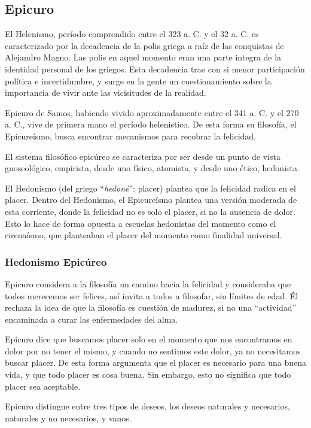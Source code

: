 \documentclass{article}
\begin{document}
\subsection{Epicuro}

El Helenismo, período comprendido entre el 323 a. C. y el 32 a. C. es caracterizado por la decadencia de la polis griega a raíz de las conquistas de Alejandro Magno. Las polis en aquel momento eran una parte integra de la identidad personal de los griegos. Esta decadencia trae con si menor participación política e incertidumbre, y surge en la gente un cuestionamiento sobre la importancia de vivir ante las vicisitudes de la realidad. 

Epicuro de Samos, habiendo vivido aproximadamente entre el 341 a. C. y el 270 a. C., vive de primera mano el período helenistico. De esta forma su filosofía, el Epicureísmo, busca encontrar mecanismos para recobrar la felicidad.

El sistema filosófico epicúreo se caracteriza por ser desde un punto de vista gnoseológico, empirista, desde uno físico, atomista, y desde uno ético, hedonista.

El Hedonismo (del griego ``\textit{hedoné}'': placer) plantea que la felicidad radica en el placer. Dentro del Hedonismo, el Epicureísmo plantea una versión moderada de esta corriente, donde la felicidad no es solo el placer, si no la ausencia de dolor. Esto lo hace de forma opuesta a escuelas hedonistas del momento como el cirenaísmo, que planteaban el placer del momento como finalidad universal.

\subsubsection{Hedonismo Epicúreo}

Epicuro considera a la filosofía un camino hacia la felicidad y consideraba que todos merecemos ser felices, así invita a todos a filosofar, sin límites de edad. Él rechaza la idea de que la filosofía es cuestión de madurez, si no una  ``actividad'' encaminada a curar las enfermedades del alma.

Epicuro dice que buscamos placer solo en el momento que nos encontramos en dolor por no tener el mismo, y cuando no sentimos este dolor, ya no necesitamos buscar placer. De esta forma argumenta que el placer es necesario para una buena vida, y que todo placer es cosa buena. Sin embargo, esto no significa que todo placer sea aceptable.

Epicuro distingue entre tres tipos de deseos, los deseos naturales y necesarios, naturales y no necesarios, y vanos.
\end{document}

